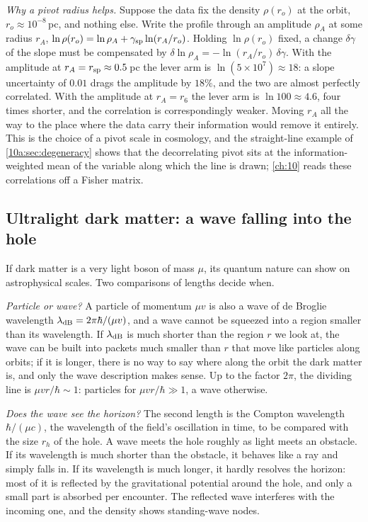 \emph{Why a pivot radius helps.} Suppose the data fix the density $\rho(r_o)$ at the orbit, $r_o\approx10^{-8}$\,pc, and nothing else. Write the profile through an amplitude $\rho_A$ at some radius $r_A$, $\ln\rho(r_o)=\ln\rho_A+\gamma_{\rm sp}\ln(r_A/r_o)$. Holding $\ln\rho(r_o)$ fixed, a change $\delta\gamma$ of the slope must be compensated by $\delta\ln\rho_A=-\ln(r_A/r_o)\,\delta\gamma$. With the amplitude at $r_A=r_{\rm sp}\approx0.5$\,pc the lever arm is $\ln(5\times10^7)\approx18$: a slope uncertainty of $0.01$ drags the amplitude by $18\%$, and the two are almost perfectly correlated. With the amplitude at $r_A=r_6$ the lever arm is $\ln100\approx4.6$, four times shorter, and the correlation is correspondingly weaker. Moving $r_A$ all the way to the place where the data carry their information would remove it entirely. This is the choice of a pivot scale in cosmology, and the straight-line example of \cref{10a:sec:degeneracy} shows that the decorrelating pivot sits at the information-weighted mean of the variable along which the line is drawn; \cref{ch:10} reads these correlations off a Fisher matrix.

\subsection{Ultralight dark matter: a wave falling into the hole}

If dark matter is a very light boson of mass $\mu$, its quantum nature can show on astrophysical scales. Two comparisons of lengths decide when.

\emph{Particle or wave?} A particle of momentum $\mu v$ is also a wave of de Broglie wavelength $\lambda_{\rm dB}=2\pi\hbar/(\mu v)$, and a wave cannot be squeezed into a region smaller than its wavelength. If $\lambda_{\rm dB}$ is much shorter than the region $r$ we look at, the wave can be built into packets much smaller than $r$ that move like particles along orbits; if it is longer, there is no way to say where along the orbit the dark matter is, and only the wave description makes sense. Up to the factor $2\pi$, the dividing line is $\mu vr/\hbar\sim1$: particles for $\mu vr/\hbar\gg1$, a wave otherwise.

\emph{Does the wave see the horizon?} The second length is the Compton wavelength $\hbar/(\mu c)$, the wavelength of the field's oscillation in time, to be compared with the size $r_h$ of the hole. A wave meets the hole roughly as light meets an obstacle. If its wavelength is much shorter than the obstacle, it behaves like a ray and simply falls in. If its wavelength is much longer, it hardly resolves the horizon: most of it is reflected by the gravitational potential around the hole, and only a small part is absorbed per encounter. The reflected wave interferes with the incoming one, and the density shows standing-wave nodes.

